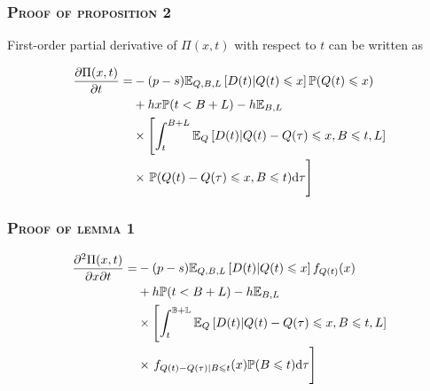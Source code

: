 \documentclass[aspectratio=169]{../presentation}
\begin{document}
    \begin{frame}
        \frametitle{\textsc{Proof of proposition 2}}

        First-order partial derivative of $\Pi(x, t)$ with respect to $t$ can be written as

        \begin{equation}
            \begin{aligned}
                \frac{\partial \Pi(x, t)}{\partial t} =& -(p-s)\mathbb E_{Q, B, L}\left[D(t) | Q(t)\leq x\right]\mathbb P(Q(t)\leq x) \\
                &+ hx\mathbb P(t < B + L) - h\mathbb E_{B, L} \\
                &\times \left[\int_t^{B+L} \mathbb E_Q\left[D(t) | Q(t) - Q(\tau)\leq x, B\leq t, L\right]\right. \\
                &\times\left.\vphantom{\int_t^{B+L}}\mathbb P(Q(t) - Q(\tau)\leq x, B\leq t)\dd \tau\right]
            \end{aligned}
        \end{equation}

    \end{frame}

    \begin{frame}
        \frametitle{\textsc{Proof of lemma 1}}

        \begin{equation}
            \begin{aligned}
                \frac{\partial ^2\Pi(x, t)}{\partial x\partial t} =
                & -(p-s)\mathbb E_{Q, B, L}\left[D(t)|Q(t)\leq x\right]f_{Q(t)}(x) \\
                & + h\mathbb P(t < B + L) - h\mathbb E_{B, L} \\
                & \times \left[\int_{t}^\mathbb{B+L}\mathbb E_Q\left[D(t)|Q(t) - Q(\tau)\leq x, B\leq t, L\right]\right. \\
                & \times \left.\vphantom{\int_t^{B+L}} f_{Q(t) - Q(\tau) | B\leq t}(x)\mathbb P(B\leq t)\dd \tau\right]
            \end{aligned}
        \end{equation}

    \end{frame}
\end{document}
